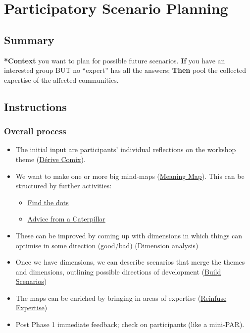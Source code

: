 \documentclass{article}
\begin{document}
\section{Participatory Scenario Planning}
\label{95072d03-1359-4863-bad1-651191eb2f38}
\subsection{Summary}

\textbf{*Context} you want to plan for possible future scenarios. \textbf{If} you have
an interested group BUT no ``expert'' has all the answers; \textbf{Then} pool the
collected expertise of the affected communities.

\subsection{Instructions}

\subsubsection{Overall process}

\begin{itemize}
\item The initial input are participants' individual reflections on the workshop theme (\hyperref[615846a2-1795-40b4-8dfb-3e12923fccc0]{Dérive Comix}).
\item We want to make one or more big mind-maps (\hyperref[407beae8-ab2f-4340-9552-211d3b92ede6]{Meaning Map}). This can be structured by further activities:
\begin{itemize}
\item \hyperref[a853be79-85c1-4ffa-9750-459192c539e8]{Find the dots}
\item \hyperref[0ef4b185-513f-40c2-b884-6213601bbe09]{Advice from a Caterpillar}
\end{itemize}
\item These can be improved by coming up with dimensions in which things can optimise in some direction (good/bad) (\href{../../git-repos/exp2exp.github.io/src/20221121183951-dimension_analysis.org}{Dimension analysis})
\item Once we have dimensions, we can describe scenarios that merge the themes and dimensions, outlining possible directions of development (\href{../../git-repos/exp2exp.github.io/src/20221121184028-build_scenarios.org}{Build Scenarios})
\item The maps can be enriched by bringing in areas of expertise (\hyperref[bf8791b5-e50b-4666-bc01-286e279a5971]{Reinfuse Expertise})
\item Post Phase 1 immediate feedback; check on participants (like a mini-PAR).
\end{itemize}
\end{document}
